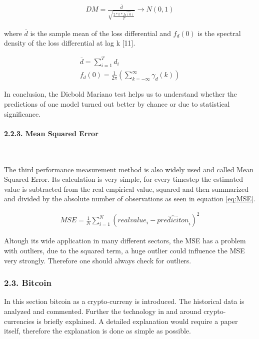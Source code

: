\documentclass[
]{article}
\begin{document}
\begin{align} \label{eq:DM}
  DM = \frac{\bar{d}}{\sqrt{\frac{2*\pi*\hat{f_{d}(0)}}{T}}} \rightarrow N(0,1)
\end{align}

where \(\bar{d}\) is the sample mean of the loss differential and
\(f_{d}(0)\) is the spectral density of the loss differential at lag k
{[}11{]}.

\begin{align} \label{eq:DM_definitions}
  \bar{d} = \sum_{i = 1}^{T}d_{i} \\
  f_{d}(0) = \frac{1}{2\pi}(\sum_{k=-\infty}^{\infty} \gamma_{d}(k))
\end{align}

In conclusion, the Diebold Mariano test helps us to understand whether
the predictions of one model turned out better by chance or due to
statistical significance.

\newpage

\hypertarget{MSE}{%
\paragraph{2.2.3. Mean Squared Error}\label{MSE}}

~

The third performance measurement method is also widely used and called
Mean Squared Error. Its calculation is very simple, for every timestep
the estimated value is subtracted from the real empirical value, squared
and then summarized and divided by the absolute number of observations
as seen in equation \ref{eq:MSE}.

\begin{align} \label{eq:MSE}
  MSE = \frac{1}{N}\sum_{i = 1}^{N}(realvalue_{i}-\hat{prediciton}_{i})^2
\end{align}  

Altough its wide application in many different sectors, the MSE has a
problem with outliers, due to the squared term, a huge outlier could
influence the MSE very strongly. Therefore one should always check for
outliers.

\newpage

\hypertarget{bitcoin}{%
\subsubsection{2.3. Bitcoin}\label{bitcoin}}

In this section bitcoin as a crypto-curreny is introduced. The
historical data is analyzed and commented. Further the technology in and
around crypto-currencies is briefly explained. A detailed explanation
would require a paper itself, therefore the explanation is done as
simple as possible.
\end{document}
